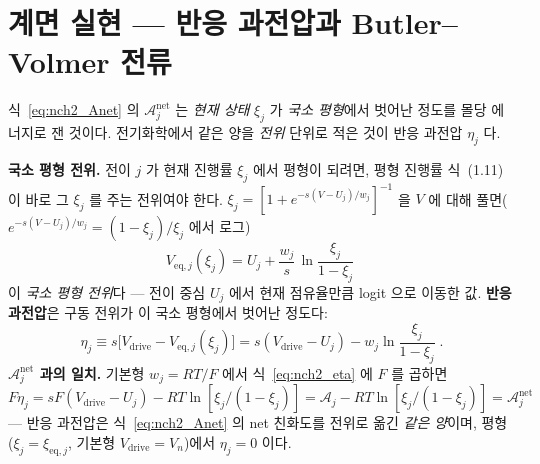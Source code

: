 \documentclass[11pt,a4paper]{article}
\newcommand{\eq}{\mathrm{eq}}
\newcommand{\drive}{\mathrm{drive}}
\begin{document}
\section{계면 실현 — 반응 과전압과 Butler--Volmer 전류}\label{sec:nch2_bv}
식~\eqref{eq:nch2_Anet} 의 $\mathcal A_j^{\mathrm{net}}$ 는 \emph{현재 상태} $\xi_j$ 가 \emph{국소 평형}에서 벗어난
정도를 몰당 에너지로 잰 것이다. 전기화학에서 같은 양을 \emph{전위} 단위로 적은 것이 반응 과전압 $\eta_j$ 다.

\textbf{국소 평형 전위.} 전이 $j$ 가 현재 진행률 $\xi_j$ 에서 평형이 되려면, 평형 진행률 식~(1.11)이 바로 그 $\xi_j$
를 주는 전위여야 한다. $\xi_j=[1+e^{-s(V-U_j)/w_j}]^{-1}$ 을 $V$ 에 대해 풀면($e^{-s(V-U_j)/w_j}=(1-\xi_j)/\xi_j$
에서 로그)
\begin{equation}
V_{\eq,j}(\xi_j)=U_j+\frac{w_j}{s}\,\ln\frac{\xi_j}{1-\xi_j}
\label{eq:nch2_Veq}
\end{equation}
이 \emph{국소 평형 전위}다 — 전이 중심 $U_j$ 에서 현재 점유율만큼 logit 으로 이동한 값. \textbf{반응 과전압}은
구동 전위가 이 국소 평형에서 벗어난 정도다:
\begin{equation}
\boxed{\;\eta_j\equiv s\big[V_\drive-V_{\eq,j}(\xi_j)\big]
=s(V_\drive-U_j)-w_j\ln\frac{\xi_j}{1-\xi_j}\;.}
\label{eq:nch2_eta}
\end{equation}
\textbf{$\mathcal A_j^{\mathrm{net}}$ 과의 일치.} 기본형 $w_j=RT/F$ 에서 식~\eqref{eq:nch2_eta} 에 $F$ 를 곱하면
$F\eta_j=sF(V_\drive-U_j)-RT\ln[\xi_j/(1-\xi_j)]=\mathcal A_j-RT\ln[\xi_j/(1-\xi_j)]=\mathcal A_j^{\mathrm{net}}$ —
반응 과전압은 식~\eqref{eq:nch2_Anet} 의 net 친화도를 전위로 옮긴 \emph{같은 양}이며, 평형($\xi_j=\xi_{\eq,j}$,
기본형 $V_\drive=V_n$)에서 $\eta_j=0$ 이다.
\end{document}
